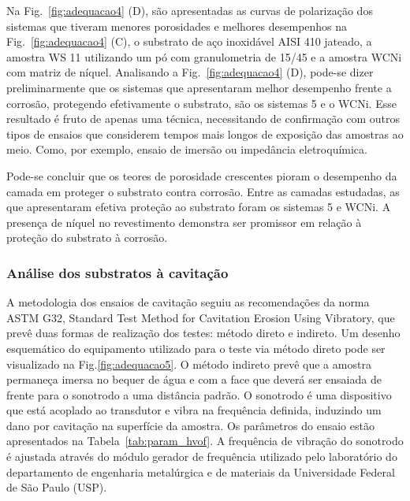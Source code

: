 Na Fig.~\ref{fig:adequacao4} (D), são apresentadas as curvas de polarização dos
sistemas que tiveram menores porosidades e melhores desempenhos na
Fig.~\ref{fig:adequacao4} (C), o substrato de aço inoxidável AISI 410 jateado, a
amostra WS 11 utilizando um pó com granulometria de 15/45 e a amostra WCNi com
matriz de níquel. Analisando a Fig.~\ref{fig:adequacao4} (D), pode-se dizer
preliminarmente que os sistemas que apresentaram melhor desempenho frente a
corrosão, protegendo efetivamente o substrato, são os sistemas 5 e o WCNi. Esse
resultado é fruto de apenas uma técnica, necessitando de confirmação com outros
tipos de ensaios que considerem tempos mais longos de exposição das amostras ao
meio. Como, por exemplo, ensaio de imersão ou impedância eletroquímica.

Pode-se concluir que os teores de porosidade crescentes pioram o desempenho da
camada em proteger o substrato contra corrosão. Entre as camadas estudadas, as
que apresentaram efetiva proteção ao substrato foram os sistemas 5 e WCNi. A
presença de níquel no revestimento demonstra ser promissor em relação à proteção
do substrato à corrosão.

\subsubsection{Análise dos substratos à cavitação}
A metodologia dos ensaios de cavitação seguiu as recomendações da norma ASTM
G32, Standard Test Method for Cavitation Erosion Using Vibratory, que prevê duas
formas de realização dos testes: método direto e indireto. Um desenho
esquemático do equipamento utilizado para o teste via método direto pode ser
visualizado na Fig.\ref{fig:adequacao5}. O método indireto prevê que a amostra
permaneça imersa no bequer de água e com a face que deverá ser ensaiada de
frente para o sonotrodo a uma distância padrão. O sonotrodo é uma
dispositivo que está acoplado ao transdutor e vibra na frequência definida, induzindo um dano
por cavitação na superfície da amostra. Os parâmetros do ensaio estão
apresentados na Tabela~\ref{tab:param_hvof}. A frequência de vibração do
sonotrodo é ajustada através do módulo gerador de frequência utilizado pelo
laboratório do departamento de engenharia metalúrgica e de materiais da Universidade Federal de São Paulo
(USP).

